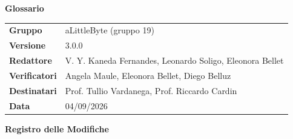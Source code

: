 \documentclass[a4paper,12pt]{article}
\begin{document}
\thispagestyle{firstpage}

\vspace*{0.5cm}

\begin{center}
    {\LARGE \textbf{Glossario}}
\end{center}

\vspace{1.5cm}

\begin{center}
    \renewcommand{\arraystretch}{1.3}
    \begin{tcolorbox}[
        width=0.92\textwidth,
        colback=gray!6,
        colframe=gray!45,
        boxrule=0.5pt,
        arc=2mm,
        boxsep=0pt,
        left=8pt, right=8pt, top=8pt, bottom=8pt
    ]
        \begin{tabularx}{\linewidth}{>{\bfseries}p{3.5cm} X}
            Gruppo      & aLittleByte (gruppo 19) \\
            Versione & 3.0.0 \\
            Redattore   & V. Y. Kaneda Fernandes, Leonardo Soligo, Eleonora Bellet \\
            Verificatori & Angela Maule, Eleonora Bellet, Diego Belluz\\
            Destinatari & Prof. Tullio Vardanega, Prof. Riccardo Cardin \\
            Data        & 04/09/2026
        \end{tabularx}
    \end{tcolorbox}
\end{center}

\newpage
{}

\begin{center}
    {\Large \textbf{Registro delle Modifiche}}
\end{center}

\vspace{0.35cm}
\end{document}
